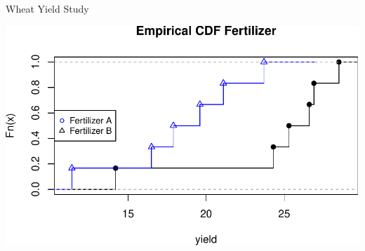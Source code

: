 \documentclass[9pt,ignorenonframetext,]{beamer}
\begin{document}
\begin{frame}{Wheat Yield Study}

\includegraphics{class4slides-jan18_files/figure-beamer/unnamed-chunk-2-1.pdf}

\end{frame}
\end{document}

